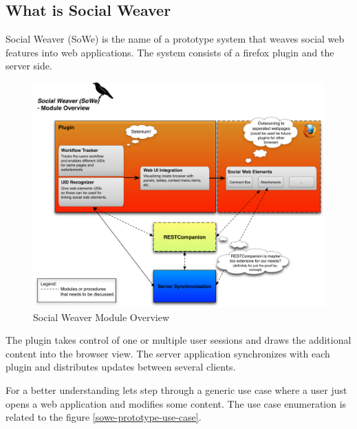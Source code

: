 
\subsection{What is Social Weaver}\label{what_is_sowe}
Social Weaver (SoWe) is the name of a prototype system that weaves social web features into web applications. The system consists of a firefox plugin and the server side.

\begin{figure}[h!] \centering
		\includegraphics[width=13cm]{images/sowe-module-overview.png}
		\caption{Social Weaver Module Overview}
		\label{msowe-module-overview}
\end{figure} 

The plugin takes control of one or multiple user sessions and draws the additional content into the browser view. The server application synchronizes with each plugin and distributes updates between several clients. 

For a better understanding lets step through a generic use case where a user just opens a web application and modifies some content. The use case enumeration is related to the figure \ref{sowe-prototype-use-case}.

